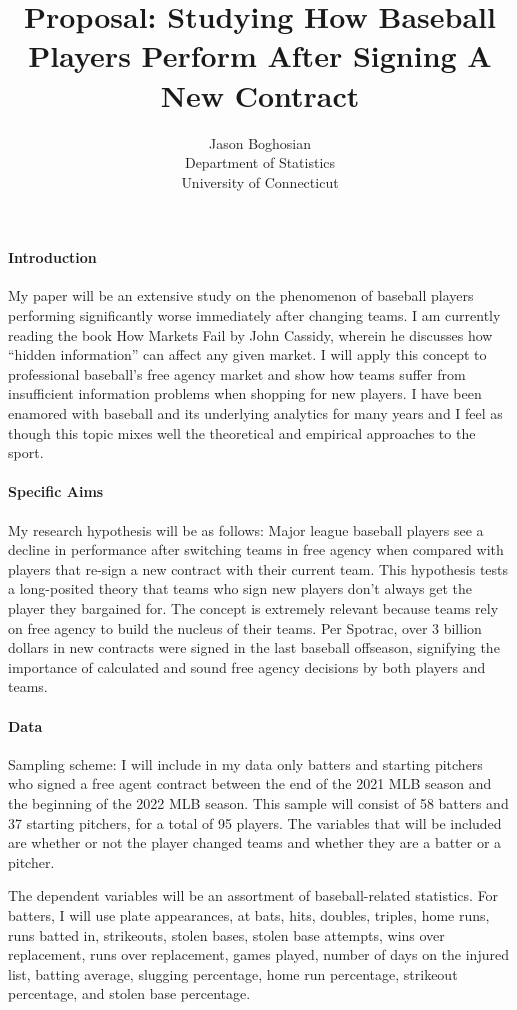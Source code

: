 \documentclass[12pt]{article}
\title{Proposal: Studying How Baseball Players Perform After Signing A New Contract}
\author{Jason Boghosian\\
  Department of Statistics\\
  University of Connecticut
}
\begin{document}
\maketitle


\paragraph{Introduction}
My paper will be an extensive study on the phenomenon of baseball players performing significantly worse immediately after changing teams. I am currently reading the book How Markets Fail by John Cassidy, wherein he discusses how “hidden information” can affect any given market. I will apply this concept to professional baseball’s free agency market and show how teams suffer from insufficient information problems when shopping for new players. I have been enamored with baseball and its underlying analytics for many years and I feel as though this topic mixes well the theoretical and empirical approaches to the sport.

\paragraph{Specific Aims}
My research hypothesis will be as follows: Major league baseball players see a decline in performance after switching teams in free agency when compared with players that re-sign a new contract with their current team. This hypothesis tests a long-posited theory that teams who sign new players don’t always get the player they bargained for. The concept is extremely relevant because teams rely on free agency to build the nucleus of their teams. Per Spotrac, over 3 billion dollars in new contracts were signed in the last baseball offseason, signifying the importance of calculated and sound free agency decisions by both players and teams.

\paragraph{Data}
Sampling scheme: I will include in my data only batters and starting pitchers who signed a free agent contract between the end of the 2021 MLB season and the beginning of the 2022 MLB season. This sample will consist of 58 batters and 37 starting pitchers, for a total of 95 players. The variables that will be included are whether or not the player changed teams and whether they are a batter or a pitcher. 

The dependent variables will be an assortment of baseball-related statistics. For batters, I will use plate appearances, at bats, hits, doubles, triples, home runs, runs batted in, strikeouts, stolen bases, stolen base attempts, wins over replacement, runs over replacement, games played, number of days on the injured list, batting average, slugging percentage, home run percentage, strikeout percentage, and stolen base percentage. 
\end{document}

